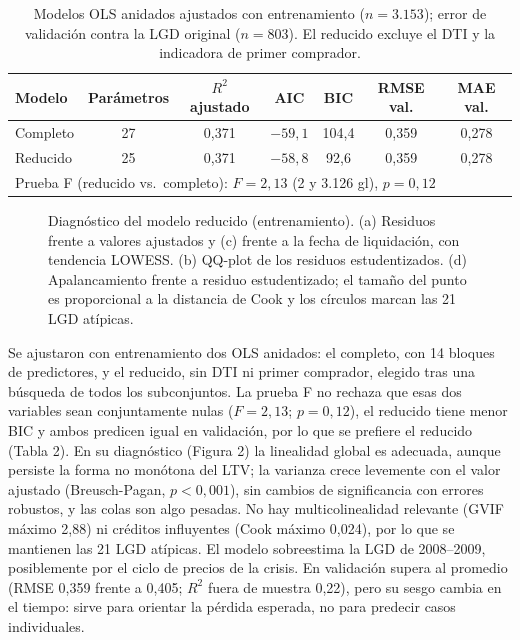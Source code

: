 \begin{table}[H]
  \centering\small
  \caption{Modelos OLS anidados ajustados con entrenamiento ($n = 3.153$); error de
  validación contra la LGD original ($n = 803$). El reducido excluye el DTI y la
  indicadora de primer comprador.}
  \begin{tabular}{lcccccc}
    \toprule
    Modelo & Parámetros & $R^2$ ajustado & AIC & BIC & RMSE val. & MAE val. \\
    \midrule
    Completo & 27 & 0,371 & $-59{,}1$ & 104,4 & 0,359 & 0,278 \\
    Reducido & 25 & 0,371 & $-58{,}8$ & 92,6 & 0,359 & 0,278 \\
    \midrule
    \multicolumn{7}{l}{Prueba F (reducido vs.\ completo): $F = 2{,}13$ (2 y 3.126 gl), $p = 0{,}12$} \\
    \bottomrule
  \end{tabular}
\end{table}

\begin{figure}[H]
  \centering
  \caption{Diagnóstico del modelo reducido (entrenamiento). (a) Residuos frente a valores ajustados y
  (c) frente a la fecha de liquidación, con tendencia LOWESS. (b) QQ-plot de los residuos estudentizados.
  (d) Apalancamiento frente a residuo estudentizado; el tamaño del punto es proporcional a la distancia de
  Cook y los círculos marcan las 21 LGD atípicas.}
\end{figure}

Se ajustaron con entrenamiento dos OLS anidados: el completo, con 14 bloques de predictores, y el reducido, sin DTI ni primer comprador, elegido tras una búsqueda de todos los subconjuntos. La prueba F no rechaza que esas dos variables sean conjuntamente nulas ($F = 2{,}13$; $p = 0{,}12$), el reducido tiene menor BIC y ambos predicen igual en validación, por lo que se prefiere el reducido (Tabla 2). En su diagnóstico (Figura 2) la linealidad global es adecuada, aunque persiste la forma no monótona del LTV; la varianza crece levemente con el valor ajustado (Breusch-Pagan, $p < 0{,}001$), sin cambios de significancia con errores robustos, y las colas son algo pesadas. No hay multicolinealidad relevante (GVIF máximo 2,88) ni créditos influyentes (Cook máximo 0,024), por lo que se mantienen las 21 LGD atípicas. El modelo sobreestima la LGD de 2008--2009, posiblemente por el ciclo de precios de la crisis. En validación supera al promedio (RMSE 0,359 frente a 0,405; $R^2$ fuera de muestra 0,22), pero su sesgo cambia en el tiempo: sirve para orientar la pérdida esperada, no para predecir casos individuales.
